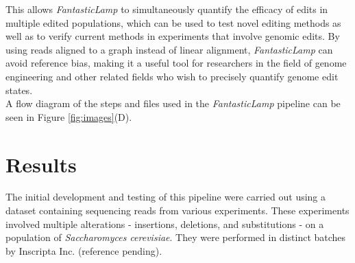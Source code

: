 \documentclass{bioinfo}
\theoremstyle{definition}
\begin{document}
This allows \textit{FantasticLamp} to simultaneously quantify the efficacy of edits in multiple edited populations, which can be used to test novel editing methods as well as to verify current methods in experiments that involve genomic edits.
By using reads aligned to a graph instead of linear alignment, \textit{FantasticLamp} can avoid reference bias, making it a useful tool for researchers in the field of genome engineering and other related fields who wish to precisely quantify genome edit states.\\
A flow diagram of the steps and files used in the \textit{FantasticLamp} pipeline can be seen in Figure \ref{fig:images}(D).



\section{Results}
\label{sec:results}

The initial development and testing of this pipeline were carried out using a dataset containing sequencing reads from various experiments. These experiments involved multiple alterations - insertions, deletions, and substitutions - on a population of \textit{Saccharomyces cerevisiae}. They were performed in distinct batches by Inscripta Inc. (reference pending).
\end{document}
